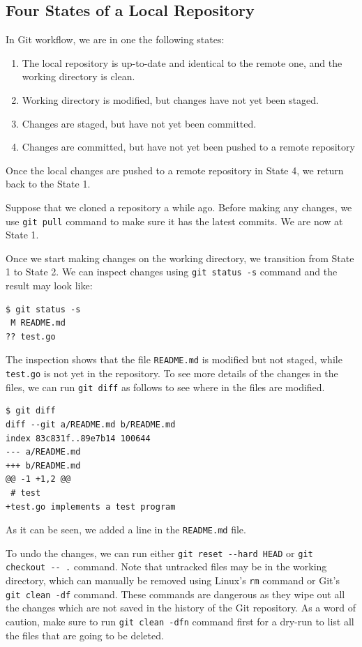 \documentclass[11pt]{article}
\begin{document}
\subsection{\label{orgtarget5} Four States of a Local Repository}
\label{sec:orgheadline10}
In Git workflow, we are in one the following states:
\begin{enumerate}
\item The local repository is up-to-date and identical to the remote one, and the working directory is clean.
\item Working directory is modified, but changes have not yet been staged.
\item Changes are staged, but have not yet been committed.
\item Changes are committed, but have not yet been pushed to a remote repository
\end{enumerate}
Once the local changes are pushed to a remote repository in State 4, we return back to the State 1.

Suppose that we cloned a repository a while ago. Before making any changes, we use \texttt{git pull} command to make sure it has the latest commits. We are now at State 1.

Once we start making changes on the working directory, we transition from State 1 to State 2. We can inspect changes using \texttt{git status -s} command and the result may look like:
\begin{verbatim}
$ git status -s
 M README.md
?? test.go
\end{verbatim}
The inspection shows that the file \texttt{README.md} is modified but not staged, while \texttt{test.go} is not yet in the repository. To see more details of the changes in the files, we can run \texttt{git diff} as follows to see where in the files are modified.
\begin{verbatim}
$ git diff
diff --git a/README.md b/README.md
index 83c831f..89e7b14 100644
--- a/README.md
+++ b/README.md
@@ -1 +1,2 @@
 # test
+test.go implements a test program
\end{verbatim}
As it can be seen, we added a line in the \texttt{README.md} file.

To undo the changes, we can run either \texttt{git reset -{}-hard HEAD} or \texttt{git checkout -{}- .} command. Note that untracked files may be in the working directory, which can manually be removed using Linux's \texttt{rm} command or Git's \texttt{git clean -df} command. These commands are dangerous as they wipe out all the changes which are not saved in the history of the Git repository. As a word of caution, make sure to run \texttt{git clean -dfn} command first for a dry-run to list all the files that are going to be deleted.
\end{document}
